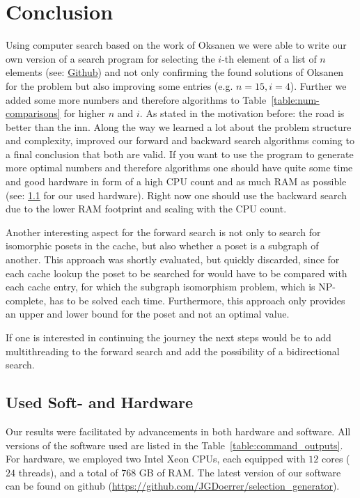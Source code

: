 \documentclass[10pt,journal,compsoc]{IEEEtran}
\begin{document}
\section{Conclusion}

Using computer search based on the work of Oksanen we were able to write our own
version of a search program for selecting the $i$-th element of a list of $n$
elements (see: \href{https://github.com/JGDoerrer/selection_generator}{Github})
and not only confirming the found solutions of Oksanen for the problem but also
improving some entries (e.g. $n = 15, i = 4$). Further we added some more
numbers and therefore algorithms to Table~\ref{table:num-comparisons} for higher $n$ and $i$. As stated
in the motivation before: the road is better than the inn. Along the way we
learned a lot about the problem structure and complexity, improved our forward
and backward search algorithms coming to a final conclusion that both are valid.
If you want to use the program to generate more optimal numbers and therefore
algorithms one should have quite some time and good hardware in form of a high
CPU count and as much RAM as possible (see: \ref{sec:hardware} for our used
hardware).
Right now one should use the backward search due to the lower RAM footprint and
scaling with the CPU count.

Another interesting aspect for the forward search is not only to search for
isomorphic posets in the cache, but also whether a poset is a subgraph of
another. This approach was shortly evaluated, but quickly discarded, since for
each cache lookup the poset to be searched for would have to be compared with
each cache entry, for which the subgraph isomorphism problem, which is
NP-complete, has to be solved each time. Furthermore, this approach only
provides an upper and lower bound for the poset and not an optimal value.

If one is interested in continuing the journey the next steps would be to add
multithreading to the forward search and add the possibility of a bidirectional
search.


\subsection{Used Soft- and Hardware} \label{sec:hardware}

Our results were facilitated by advancements in both hardware and software.
All versions of the software used are listed in the Table~\ref{table:command_outputs}.
For hardware, we employed two Intel Xeon CPUs, each equipped with $12$ cores ($24$ threads), and a total of $768$ GB of RAM.
The latest version of our software can be found on github (\url{https://github.com/JGDoerrer/selection_generator}).
\end{document}
